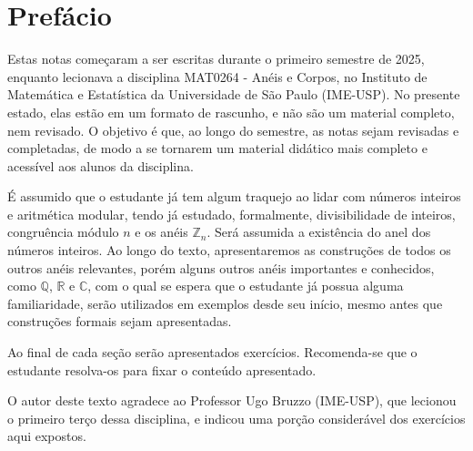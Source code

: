 \chapter{Prefácio}

Estas notas começaram a ser escritas durante o primeiro semestre de 2025, enquanto lecionava a disciplina MAT0264 - Anéis e Corpos, no Instituto de Matemática e Estatística da Universidade de São Paulo (IME-USP).
No presente estado, elas estão em um formato de rascunho, e não são um material completo, nem revisado. O objetivo é que, ao longo do semestre, as notas sejam revisadas e completadas, de modo a se tornarem um material didático mais completo e acessível aos alunos da disciplina.

É assumido que o estudante já tem algum traquejo ao lidar com números inteiros e aritmética modular, tendo já estudado, formalmente, divisibilidade de inteiros, congruência módulo $n$ e os anéis $\mathbb Z_n$.
Será assumida a existência do anel dos números inteiros.
Ao longo do texto, apresentaremos as construções de todos os outros anéis relevantes, porém alguns outros anéis importantes e conhecidos, como $\mathbb Q$, $\mathbb R$ e $\mathbb C$, com o qual se espera que o estudante já possua alguma familiaridade, serão utilizados em exemplos desde seu início, mesmo antes que construções formais sejam apresentadas.

Ao final de cada seção serão apresentados exercícios. Recomenda-se que o estudante resolva-os para fixar o conteúdo apresentado.

O autor deste texto agradece ao Professor Ugo Bruzzo (IME-USP), que lecionou o primeiro terço dessa disciplina, e indicou uma porção considerável dos exercícios aqui expostos.